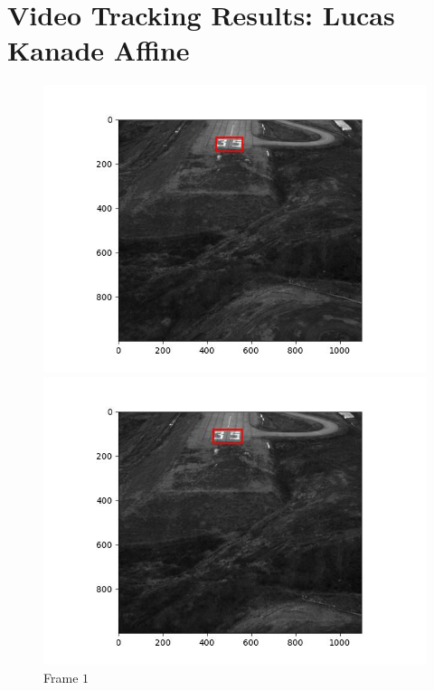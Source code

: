 \section{Video Tracking Results: Lucas Kanade Affine}


\begin{figure}[H]
  \centering
  \begin{minipage}{.49\textwidth}
    \centering
    \includegraphics[width=\textwidth]{./figures/lk_affine/landing/frame000001.jpg}
    \caption{Frame $1$}
  \end{minipage}
  \hfill
  \begin{minipage}{.49\textwidth}
    \centering
    \includegraphics[width=\textwidth]{./figures/lk_affine/landing/frame000010.jpg}

\end{minipage}
\end{figure}
